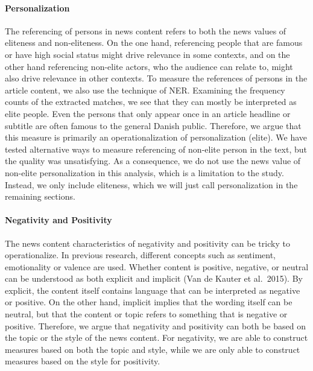 \documentclass[
]{article}
\begin{document}
\hypertarget{personalization}{%
\paragraph*{Personalization}\label{personalization}}

\hspace{-2.5em}

\noindent The referencing of persons in news content refers to both the
news values of eliteness and non-eliteness. On the one hand, referencing
people that are famous or have high social status might drive relevance
in some contexts, and on the other hand referencing non-elite actors,
who the audience can relate to, might also drive relevance in other
contexts. To measure the references of persons in the article content,
we also use the technique of NER. Examining the frequency counts of the
extracted matches, we see that they can mostly be interpreted as elite
people. Even the persons that only appear once in an article headline or
subtitle are often famous to the general Danish public. Therefore, we
argue that this measure is primarily an operationalization of
personalization (elite). We have tested alternative ways to measure
referencing of non-elite person in the text, but the quality was
unsatisfying. As a consequence, we do not use the news value of
non-elite personalization in this analysis, which is a limitation to the
study. Instead, we only include eliteness, which we will just call
personalization in the remaining sections.

\hypertarget{negativity-and-positivity}{%
\paragraph*{Negativity and Positivity}\label{negativity-and-positivity}}

\hspace{-2.5em}

\noindent The news content characteristics of negativity and positivity
can be tricky to operationalize. In previous research, different
concepts such as sentiment, emotionality or valence are used. Whether
content is positive, negative, or neutral can be understood as both
explicit and implicit (Van de Kauter et al.~2015). By explicit, the
content itself contains language that can be interpreted as negative or
positive. On the other hand, implicit implies that the wording itself
can be neutral, but that the content or topic refers to something that
is negative or positive. Therefore, we argue that negativity and
positivity can both be based on the topic or the style of the news
content. For negativity, we are able to construct measures based on both
the topic and style, while we are only able to construct measures based
on the style for positivity.
\end{document}
